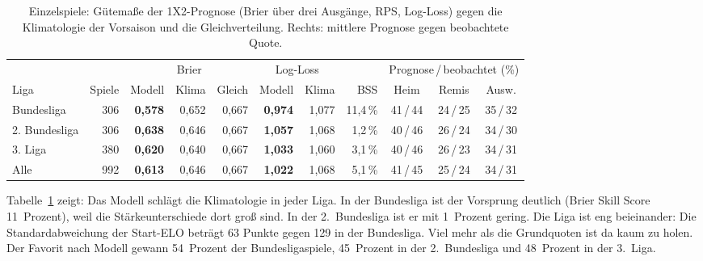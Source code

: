 \documentclass[11pt,a4paper,parskip=half,numbers=noenddot]{scrartcl}
\newcommand{\tab}[1]{Tabelle~\ref{#1}}
\begin{document}
\begin{table}[!htbp]
\centering\footnotesize\setlength{\tabcolsep}{3.5pt}
\caption{Einzelspiele: Gütemaße der 1X2-Prognose (Brier über drei Ausgänge,
RPS, Log-Loss) gegen die Klimatologie der Vorsaison und die
Gleichverteilung. Rechts: mittlere Prognose gegen beobachtete Quote.}\label{tab:spiele}
\begin{tabular}{@{}l r rrr rr r ccc@{}}
\toprule
& & \multicolumn{3}{c}{Brier} & \multicolumn{2}{c}{Log-Loss} & & \multicolumn{3}{c}{Prognose\,/\,beobachtet (\%)} \\
\cmidrule(lr){3-5}\cmidrule(lr){6-7}\cmidrule(l){9-11}
Liga & Spiele & Modell & Klima & Gleich & Modell & Klima & BSS & Heim & Remis & Ausw. \\
\midrule
Bundesliga    & 306 & \textbf{0,578} & 0,652 & 0,667 & \textbf{0,974} & 1,077 & 11,4\,\% & 41\,/\,44 & 24\,/\,25 & 35\,/\,32 \\
2. Bundesliga & 306 & \textbf{0,638} & 0,646 & 0,667 & \textbf{1,057} & 1,068 &  1,2\,\% & 40\,/\,46 & 26\,/\,24 & 34\,/\,30 \\
3. Liga       & 380 & \textbf{0,620} & 0,640 & 0,667 & \textbf{1,033} & 1,060 &  3,1\,\% & 40\,/\,46 & 26\,/\,23 & 34\,/\,31 \\
\midrule
Alle          & 992 & \textbf{0,613} & 0,646 & 0,667 & \textbf{1,022} & 1,068 &  5,1\,\% & 41\,/\,45 & 25\,/\,24 & 34\,/\,31 \\
\bottomrule
\end{tabular}
\end{table}

\tab{tab:spiele} zeigt: Das Modell schlägt die Klimatologie in jeder Liga.
In der Bundesliga ist der Vorsprung deutlich (Brier Skill Score 11~Prozent),
weil die Stärkeunterschiede dort groß sind. In der 2.~Bundesliga ist er mit
1~Prozent gering. Die Liga ist eng beieinander: Die Standardabweichung der Start-ELO
beträgt 63 Punkte gegen 129 in der Bundesliga. Viel mehr als die
Grundquoten ist da kaum zu holen. Der Favorit nach Modell gewann 54~Prozent der
Bundesligaspiele, 45~Prozent in der 2.~Bundesliga und 48~Prozent in der
3.~Liga.
\end{document}
